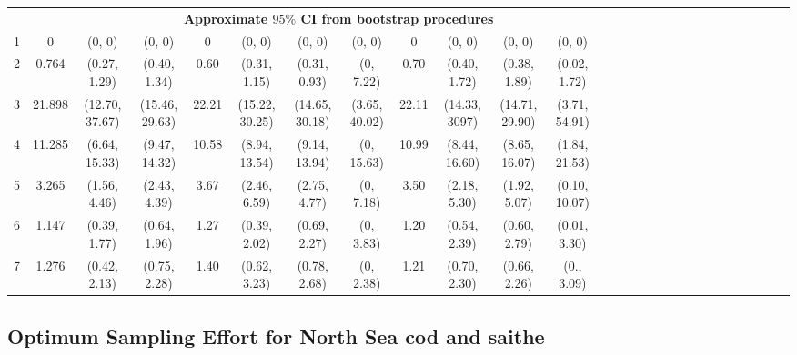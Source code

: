 \documentclass[a4paper 12pt]{article}
\numberwithin{equation}{section}
\begin{document}
\begin{small}
\begin{table}[h!]
\begin{tabular}{ccccccccccccccccccccccccccc}
 &&& \multicolumn{8}{c}{\bf Approximate $95 \%$ CI from bootstrap procedures} \\[1.5ex]
1  & 0      &(0, 0)          & (0, 0)        & 0     &(0, 0)          &  (0, 0)          & (0, 0)       & 0     &(0, 0) & (0, 0)         & (0, 0)          & \\[1ex]
2  & 0.764  & (0.27, 1.29)   & (0.40, 1.34)  & 0.60  &(0.31, 1.15)    &  (0.31, 0.93)    & (0, 7.22)    & 0.70  &(0.40, 1.72)  & (0.38, 1.89)   & (0.02, 1.72) \\[1ex]
3  & 21.898 & (12.70, 37.67) & (15.46, 29.63)& 22.21 & (15.22, 30.25) &  (14.65, 30.18)  & (3.65, 40.02)& 22.11 &(14.33, 3097) & (14.71, 29.90) & (3.71, 54.91)\\[1ex]
4  & 11.285 &(6.64, 15.33)   & (9.47, 14.32) & 10.58 &(8.94, 13.54)   &  (9.14, 13.94)   & (0, 15.63)   & 10.99 &(8.44, 16.60) & (8.65, 16.07)  & (1.84, 21.53)\\[1ex]
5  & 3.265  &(1.56, 4.46)    & (2.43, 4.39)  & 3.67  &(2.46, 6.59)    &  (2.75, 4.77)    & (0, 7.18)    & 3.50  &(2.18, 5.30)  & (1.92, 5.07)   & (0.10, 10.07)\\[1ex]
6  & 1.147  &(0.39, 1.77)    & (0.64, 1.96)  & 1.27  & (0.39, 2.02)   &  (0.69, 2.27)    & (0, 3.83)    & 1.20  & (0.54, 2.39)  & (0.60, 2.79)   & (0.01, 3.30)\\[1ex]
7  & 1.276  &(0.42, 2.13)    & (0.75, 2.28)  & 1.40  &(0.62, 3.23)    &  (0.78, 2.68)    & (0, 2.38)    & 1.21  &(0.70, 2.30)  & (0.66, 2.26)   & (0., 3.09) \\[1ex]
\hline
\end{tabular}
\end{table}
\end{small}


\subsection{Optimum Sampling Effort for North Sea cod and saithe}
\label{sec:resultsoptim}



\clearpage
\end{document}
